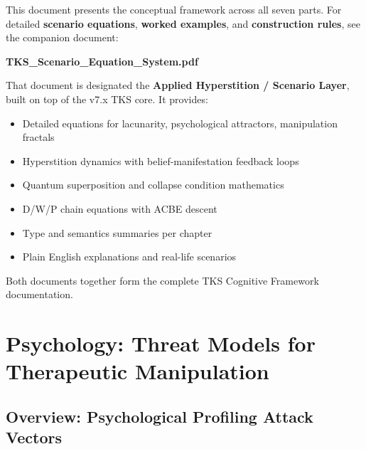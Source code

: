 \documentclass[11pt,twoside]{book}
\theoremstyle{definition}
\theoremstyle{plain}
\theoremstyle{remark}
\begin{document}
\begin{tcolorbox}[colback=blue!5!white,colframe=blue!75!black,title=\textbf{Companion Document: Applied Hyperstition / Scenario Layer},breakable]
This document presents the conceptual framework across all seven parts. For detailed \textbf{scenario equations}, \textbf{worked examples}, and \textbf{construction rules}, see the companion document:

\begin{center}
\textbf{TKS\_Scenario\_Equation\_System.pdf}
\end{center}

That document is designated the \textbf{Applied Hyperstition / Scenario Layer}, built on top of the v7.x TKS core. It provides:
\begin{itemize}
    \item Detailed equations for lacunarity, psychological attractors, manipulation fractals
    \item Hyperstition dynamics with belief-manifestation feedback loops
    \item Quantum superposition and collapse condition mathematics
    \item D/W/P chain equations with ACBE descent
    \item Type and semantics summaries per chapter
    \item Plain English explanations and real-life scenarios
\end{itemize}
Both documents together form the complete TKS Cognitive Framework documentation.
\end{tcolorbox}

\part{Psychology: Threat Models for Therapeutic Manipulation}
\label{part:psychology}

\chapter{Overview: Psychological Profiling Attack Vectors}
\label{ch:psych-overview}
\end{document}
